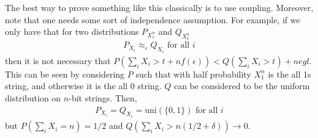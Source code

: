 \documentclass[11pt, oneside]{article}   	%
\begin{document}
The best way to prove something like this classically is to use coupling. Moreover, note that one needs some sort of independence assumption. For example, if we only have that for two distributions $P_{X_1^n}$ and $Q_{X_1^n}$
\begin{align}
    P_{X_i} \approx_\epsilon Q_{X_i} \text{ for all } i
\end{align}
then it is not necessary that $P(\sum_i X_i > t+ nf(\epsilon)) < Q(\sum_i X_i > t) + negl$. This can be seen by considering $P$ such that with half probability $X_1^n$ is the all 1s string, and otherwise it is the all 0 string. $Q$ can be considered to be the uniform distribution on $n$-bit strings. Then, 
\begin{align}
    P_{X_i} = Q_{X_i} = \text{uni}(\{0,1\}) \text{ for all } i
\end{align}
but $P(\sum_i X_i =n) = 1/2$ and $Q(\sum_i X_i > n(1/2 + \delta)) \rightarrow 0$.
\end{document}
